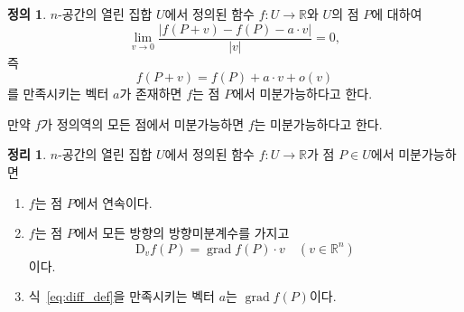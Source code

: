 \documentclass[unfonts,oneside,a4paper]{oblivoir}
\theoremstyle{definition}
\newtheorem{definition}{정의}[subsubsection]
\theoremstyle{theorem}
\newtheorem{theorem}{정리}[subsubsection]
\renewcommand{\vec}[1]{\bm{\mathit{#1}}}
\newcommand{\vecz}{\bm{\mathrm{0}}}
\newcommand{\dD}{\mathrm{D}}
\DeclareMathOperator{\grad}{grad}
\begin{document}
\begin{definition}
    $n$-공간의 열린 집합 $U$에서 정의된 함수 $f: U \rightarrow \mathbb R$와 $U$의 점 $P$에 대하여
    \begin{equation} \label{eq:diff_def}
        \lim_{\vec v \rightarrow \vecz} \frac{|f(P + \vec v) - f(P) - \vec a \cdot \vec v|}{|\vec v|} = 0,
    \end{equation}
    즉
    \begin{equation} \label{eq:diff_alt_def}
        f(P + \vec v) = f(P) + \vec a \cdot \vec v + o(\vec v)
    \end{equation}
    를 만족시키는 벡터 $\vec a$가 존재하면 $f$는 점 $P$에서 미분가능하다고 한다.

    만약 $f$가 정의역의 모든 점에서 미분가능하면 $f$는 미분가능하다고 한다.
\end{definition}

\begin{theorem} \label{thm:grad_differential}
    $n$-공간의 열린 집합 $U$에서 정의된 함수 $f:U \rightarrow \mathbb R$가 점 $P \in U$에서 미분가능하면
    \begin{enumerate}
        \item $f$는 점 $P$에서 연속이다.
        \item $f$는 점 $P$에서 모든 방향의 방향미분계수를 가지고
            \begin{equation*}
                \dD_{\vec v} f(P) = \grad f(P) \cdot \vec v \quad (\vec v \in \mathbb R^n)
            \end{equation*}
            이다.
        \item 식~\ref{eq:diff_def}을 만족시키는 벡터 $\vec a$는 $\grad f(P)$이다.
    \end{enumerate}
\end{theorem}
\end{document}
